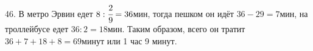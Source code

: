 46. В метро Эрвин едет $8:\cfrac{2}{9}=36$мин, тогда пешком он идёт $36-29=7$мин, на троллейбусе едет $36:2=18$мин. Таким образом, всего он тратит $36+7+18+8=69$минут или 1 час 9 минут.\\
